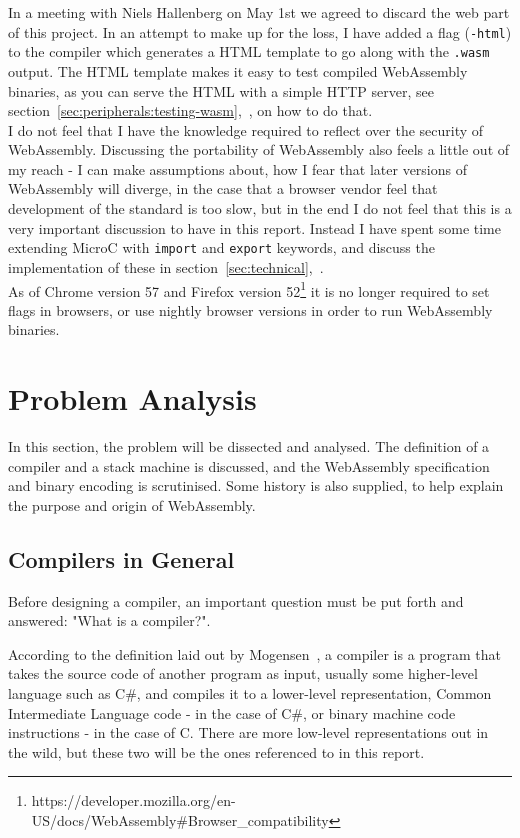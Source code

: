 \documentclass[a4paper]{article}
\begin{document}
In a meeting with Niels Hallenberg on May 1st we agreed to discard the web part of this project. In an attempt to make up for the loss, I have added a flag (\texttt{-html}) to the compiler which generates a HTML template to go along with the \texttt{.wasm} output. The HTML template makes it easy to test compiled WebAssembly binaries, as you can serve the HTML with a simple HTTP server, see section~\ref{sec:peripherals:testing-wasm},~, on how to do that.\\

\noindent I do not feel that I have the knowledge required to reflect over the security of WebAssembly. Discussing the portability of WebAssembly also feels a little out of my reach - I can make assumptions about, how I fear that later versions of WebAssembly will diverge, in the case that a browser vendor feel that development of the standard is too slow, but in the end I do not feel that this is a very important discussion to have in this report. Instead I have spent some time extending MicroC with \texttt{import} and \texttt{export} keywords, and discuss the implementation of these in section~\ref{sec:technical},~.\\

\noindent As of Chrome version 57 and Firefox version 52\footnote{https://developer.mozilla.org/en-US/docs/WebAssembly\#Browser\_compatibility} it is no longer required to set flags in browsers, or use nightly browser versions in order to run WebAssembly binaries.

\newpage
\section{Problem Analysis}
\label{sec:problem-analysis}
In this section, the problem will be dissected and analysed. The definition of a compiler and a stack machine is discussed, and the WebAssembly specification and binary encoding is scrutinised. Some history is also supplied, to help explain the purpose and origin of WebAssembly.

\subsection{Compilers in General}
\label{sec:problem-analysis:compilers}
Before designing a compiler, an important question must be put forth and answered: "What is a compiler?".

According to the definition laid out by Mogensen~\cite{BCD}, a compiler is a program that takes the source code of another program as input, usually some higher-level language such as C\#, and compiles it to a lower-level representation, Common Intermediate Language code - in the case of C\#, or binary machine code instructions - in the case of C. There are more low-level representations out in the wild, but these two will be the ones referenced to in this report.
\end{document}
